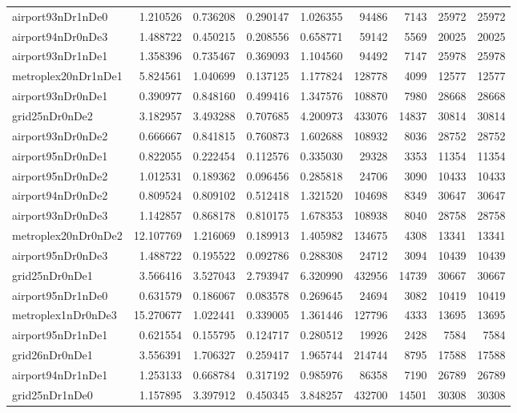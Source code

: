 \begin{longtable}{|l|r|r|r|r|r|r|r|r|}
airport93nDr1nDe0 & 1.210526 & 0.736208 & 0.290147 & 1.026355 & 94486 & 7143 & 25972 & 25972 \\
airport94nDr0nDe3 & 1.488722 & 0.450215 & 0.208556 & 0.658771 & 59142 & 5569 & 20025 & 20025 \\
airport93nDr1nDe1 & 1.358396 & 0.735467 & 0.369093 & 1.104560 & 94492 & 7147 & 25978 & 25978 \\
metroplex20nDr1nDe1 & 5.824561 & 1.040699 & 0.137125 & 1.177824 & 128778 & 4099 & 12577 & 12577 \\
airport93nDr0nDe1 & 0.390977 & 0.848160 & 0.499416 & 1.347576 & 108870 & 7980 & 28668 & 28668 \\
grid25nDr0nDe2 & 3.182957 & 3.493288 & 0.707685 & 4.200973 & 433076 & 14837 & 30814 & 30814 \\
airport93nDr0nDe2 & 0.666667 & 0.841815 & 0.760873 & 1.602688 & 108932 & 8036 & 28752 & 28752 \\
airport95nDr0nDe1 & 0.822055 & 0.222454 & 0.112576 & 0.335030 & 29328 & 3353 & 11354 & 11354 \\
airport95nDr0nDe2 & 1.012531 & 0.189362 & 0.096456 & 0.285818 & 24706 & 3090 & 10433 & 10433 \\
airport94nDr0nDe2 & 0.809524 & 0.809102 & 0.512418 & 1.321520 & 104698 & 8349 & 30647 & 30647 \\
airport93nDr0nDe3 & 1.142857 & 0.868178 & 0.810175 & 1.678353 & 108938 & 8040 & 28758 & 28758 \\
metroplex20nDr0nDe2 & 12.107769 & 1.216069 & 0.189913 & 1.405982 & 134675 & 4308 & 13341 & 13341 \\
airport95nDr0nDe3 & 1.488722 & 0.195522 & 0.092786 & 0.288308 & 24712 & 3094 & 10439 & 10439 \\
grid25nDr0nDe1 & 3.566416 & 3.527043 & 2.793947 & 6.320990 & 432956 & 14739 & 30667 & 30667 \\
airport95nDr1nDe0 & 0.631579 & 0.186067 & 0.083578 & 0.269645 & 24694 & 3082 & 10419 & 10419 \\
metroplex1nDr0nDe3 & 15.270677 & 1.022441 & 0.339005 & 1.361446 & 127796 & 4333 & 13695 & 13695 \\
airport95nDr1nDe1 & 0.621554 & 0.155795 & 0.124717 & 0.280512 & 19926 & 2428 & 7584 & 7584 \\
grid26nDr0nDe1 & 3.556391 & 1.706327 & 0.259417 & 1.965744 & 214744 & 8795 & 17588 & 17588 \\
airport94nDr1nDe1 & 1.253133 & 0.668784 & 0.317192 & 0.985976 & 86358 & 7190 & 26789 & 26789 \\
grid25nDr1nDe0 & 1.157895 & 3.397912 & 0.450345 & 3.848257 & 432700 & 14501 & 30308 & 30308 \\

\end{longtable}
